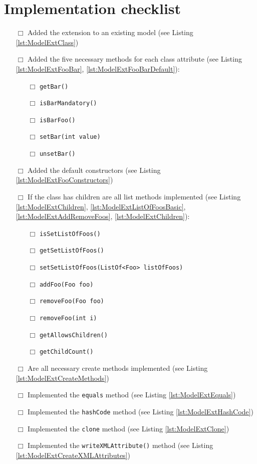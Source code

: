 \section{Implementation checklist}
    \begin{itemize}
        \item [$\Box$] Added the extension to an existing model (see Listing \ref{lst:ModelExtClass})
        \item [$\Box$] Added the five necessary methods for each class attribute (see Listing \ref{lst:ModelExtFooBar}, \ref{lst:ModelExtFooBarDefault}):
            \begin{itemize}
              \item [$\Box$] \texttt{getBar()}
              \item [$\Box$] \texttt{isBarMandatory()}
              \item [$\Box$] \texttt{isBarFoo()}
              \item [$\Box$] \texttt{setBar(int value)}
              \item [$\Box$] \texttt{unsetBar()}
            \end{itemize}
        \item [$\Box$] Added the default constructors (see Listing \ref{lst:ModelExtFooConstructors})
        \item [$\Box$] If the class has children are all list methods implemented (see Listing \ref{lst:ModelExtChildren}, \ref{lst:ModelExtListOfFoosBasic}, \ref{lst:ModelExtAddRemoveFoos}, \ref{lst:ModelExtChildren}):
            \begin{itemize}
              \item [$\Box$] \texttt{isSetListOfFoos()}
              \item [$\Box$] \texttt{getSetListOfFoos()}
              \item [$\Box$] \texttt{setSetListOfFoos(ListOf<Foo> listOfFoos)}
              \item [$\Box$] \texttt{addFoo(Foo foo)}
              \item [$\Box$] \texttt{removeFoo(Foo foo)}
              \item [$\Box$] \texttt{removeFoo(int i)}
              \item [$\Box$] \texttt{getAllowsChildren()}
              \item [$\Box$] \texttt{getChildCount()}
            \end{itemize}
        \item [$\Box$] Are all necessary create methods implemented (see Listing \ref{lst:ModelExtCreateMethods})
        \item [$\Box$] Implemented the \texttt{equals} method (see Listing \ref{lst:ModelExtEquals})
        \item [$\Box$] Implemented the \texttt{hashCode} method (see Listing \ref{lst:ModelExtHashCode})
        \item [$\Box$] Implemented the \texttt{clone} method (see Listing \ref{lst:ModelExtClone})
        \item [$\Box$] Implemented the \texttt{writeXMLAttribute()} method (see Listing \ref{lst:ModelExtCreateXMLAttributes})
   \end{itemize}
